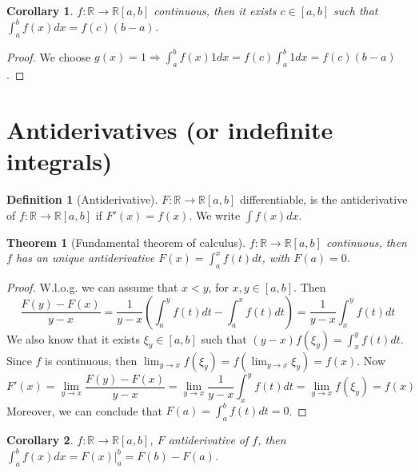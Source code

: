 \documentclass{article}
\newcommand{\DS}{\displaystyle}
\newcommand{\Ar}{\Rightarrow}
\newcommand{\fOnR}[1]{#1 : \mathbb{R} \rightarrow \mathbb{R}}
\newcommand{\intcc}[1]{\left[#1\right]}
\theoremstyle{definition}
\newtheorem{definition}{Definition}[section]
\theoremstyle{definition}
\theoremstyle{plain}
\newtheorem{theorem}{Theorem}[section]
\theoremstyle{plain}
\newtheorem{corollary}{Corollary}[theorem]
\theoremstyle{plain}
\theoremstyle{plain}
\theoremstyle{definition}
\theoremstyle{remark}
\theoremstyle{remark}
\theoremstyle{remark}
\theoremstyle{remark}
\begin{document}
\begin{corollary}
  $\fOnR{f}{\intcc{a,b}}$ continuous, then it exists $c \in \intcc{a,b}$ such that $\int_a^b f(x) dx = f(c) (b-a)$.
\end{corollary}

\begin{proof}
  We choose $g(x) = 1 \Ar \int_a^b f(x) 1 dx = f(c) \int_a^b 1 dx = f(c) (b-a)$.
\end{proof}


\newpage
\section{Antiderivatives (or indefinite integrals)}


\begin{definition}[Antiderivative]
  $\fOnR{F}{\intcc{a,b}}$ differentiable, is the antiderivative of $\fOnR{f}{\intcc{a,b}}$ if $F'(x) = f(x)$. We write $\int f(x) dx$.
\end{definition}


\begin{theorem}[Fundamental theorem of calculus]
  $\fOnR{f}{\intcc{a,b}}$ continuous, then $f$ has an unique antiderivative $F(x) = \int_a^x f(t) dt$, with $F(a) = 0$.
\end{theorem}

\begin{proof}
  W.l.o.g. we can assume that $x < y$, for $x,y \in \intcc{a,b}$. Then
  \[
    \frac{F(y)-F(x)}{y-x} =
    \frac{1}{y-x}\left(\int_a^y f(t) dt - \int_a^x f(t) dt\right) =
    \frac{1}{y-x} \int_x^y f(t) dt
  \]
  We also know that it exists $\xi_y \in \intcc{a,b}$ such that $(y-x) f(\xi_y) = \int_x^y f(t) dt$. Since $f$ is continuous, then $\DS \lim_{y \to x} f(\xi_y) = f(\lim_{y \to x} \xi_y) = f(x)$. Now
  \[
    F'(x) =
    \lim_{y \to x} \frac{F(y)-F(x)}{y-x} =
    \lim_{y \to x} \frac{1}{y-x} \int_x^y f(t) dt =
    \lim_{y \to x} f(\xi_y) =
    f(x)
  \]
  Moreover, we can conclude that $F(a) = \int_a^b f(t) dt = 0$.
\end{proof}

\begin{corollary}
  $\fOnR{f}{\intcc{a,b}}$, $F$ antiderivative of $f$, then $\int_a^b f(x) dx = F(x) |_a^b = F(b) - F(a)$.
\end{corollary}
\end{document}
